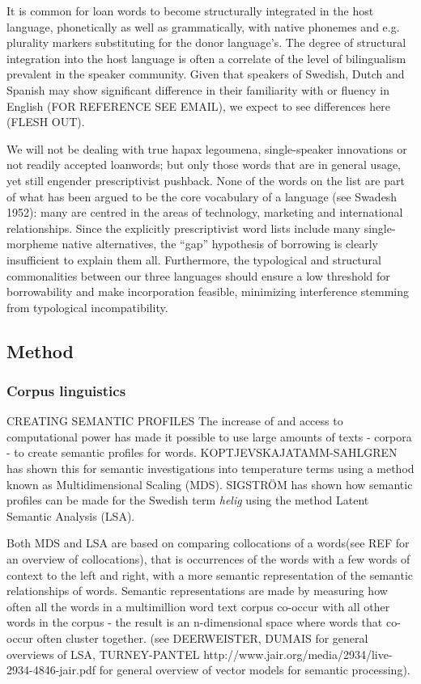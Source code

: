 \documentclass[a4paper]{article}
\begin{document}
It is common for loan words to become structurally integrated in the host language, phonetically as well as grammatically, with native phonemes and e.g. plurality markers substituting for the donor language's. The degree of structural integration into the host language is often a correlate of the level of bilingualism prevalent in the speaker community. Given that speakers of Swedish, Dutch and Spanish may show significant difference in their familiarity with or fluency in English (FOR REFERENCE SEE EMAIL), we expect to see differences here (FLESH OUT). 

We will not be dealing with true hapax legoumena, single-speaker innovations or not readily accepted loanwords; but only those words that are in general usage, yet still engender prescriptivist pushback. None of the words on the list are part of what has been argued to be the core vocabulary of a language (see Swadesh 1952): many are centred in the areas of technology, marketing and international relationships. Since the explicitly prescriptivist word lists include many single-morpheme native alternatives, the ``gap'' hypothesis of borrowing is clearly insufficient to explain them all. Furthermore, the typological and structural commonalities between our three languages should ensure a low threshold for borrowability and make incorporation feasible, minimizing interference stemming from typological incompatibility.


\subsection{Method}


\subsubsection{Corpus linguistics}
CREATING SEMANTIC PROFILES
The increase of and access to computational power has made it possible to use large amounts of texts - corpora - to create semantic profiles for words. KOPTJEVSKAJATAMM-SAHLGREN has shown this for semantic investigations into temperature terms using a method known as Multidimensional Scaling (MDS). SIGSTRÖM has shown how semantic profiles can be made for the Swedish term \textit{helig} using the method Latent Semantic Analysis (LSA). 

Both MDS and LSA are based on comparing collocations of a words(see REF for an overview of collocations), that is occurrences of the words with a few words of context to the left and right, with a more semantic representation of the semantic relationships of words. Semantic representations are made by measuring how often all the words in a multimillion word text corpus co-occur with all other words in the corpus - the result is an n-dimensional space where words that co-occur often cluster together. (see DEERWEISTER, DUMAIS for general overviews of LSA, TURNEY-PANTEL http://www.jair.org/media/2934/live-2934-4846-jair.pdf for general overview of vector models for semantic processing).
\end{document}
